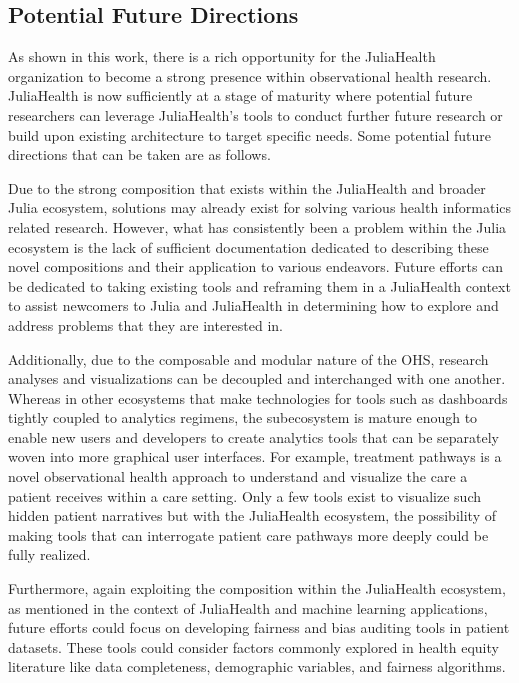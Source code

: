 \documentclass{juliacon}
\begin{document}
\subsection{Potential Future Directions}

As shown in this work, there is a rich opportunity for the JuliaHealth organization to become a strong presence within observational health research. 
JuliaHealth is now sufficiently at a stage of maturity where potential future researchers can leverage JuliaHealth's tools to conduct further future research or build upon existing architecture to target specific needs.
Some potential future directions that can be taken are as follows.

Due to the strong composition that exists within the JuliaHealth and broader Julia ecosystem, solutions may already exist for solving various health informatics related research.
However, what has consistently been a problem within the Julia ecosystem is the lack of sufficient documentation dedicated to describing these novel compositions and their application to various endeavors.
Future efforts can be dedicated to taking existing tools and reframing them in a JuliaHealth context to assist newcomers to Julia and JuliaHealth in determining how to explore and address problems that they are interested in.

Additionally, due to the composable and modular nature of the OHS, research analyses and visualizations can be decoupled and interchanged with one another.
Whereas in other ecosystems that make technologies for tools such as dashboards tightly coupled to analytics regimens, the subecosystem is mature enough to enable new users and developers to create analytics tools that can be separately woven into more graphical user interfaces.
For example, treatment pathways is a novel observational health approach to understand and visualize the care a patient receives within a care setting.
Only a few tools exist to visualize such hidden patient narratives but with the JuliaHealth ecosystem, the possibility of making tools that can interrogate patient care pathways more deeply could be fully realized.

Furthermore, again exploiting the composition within the JuliaHealth ecosystem, as mentioned in the context of JuliaHealth and machine learning applications, future efforts could focus on developing fairness and bias auditing tools in patient datasets.
These tools could consider factors commonly explored in health equity literature like data completeness, demographic variables, and fairness algorithms. 
\end{document}
